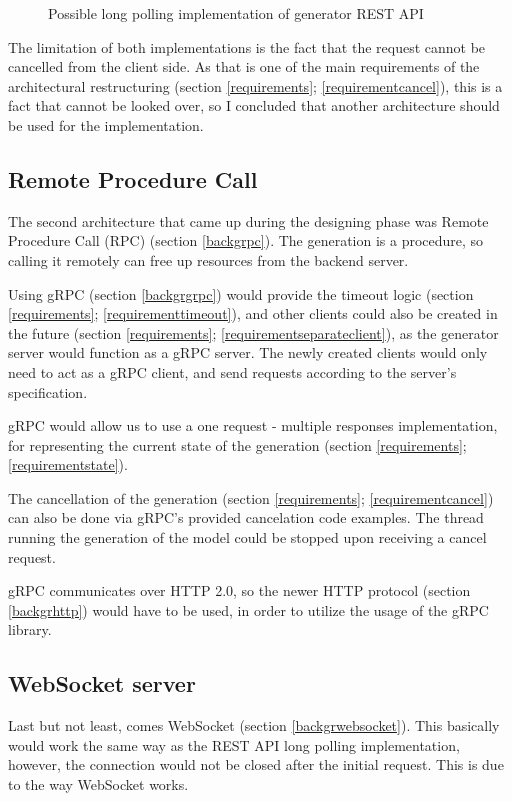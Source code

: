 \begin{itemize}
\begin{figure}
\begin{center}
				\caption{Possible long polling implementation of generator REST API}
				\label{longpollingimage}
			\end{center}
		\end{figure}
\end{itemize}
The limitation of both implementations is the fact that the request cannot be cancelled from the client side. As that is one 
of the main requirements of the architectural restructuring (section \ref{requirements}; \ref{requirementcancel}), this 
is a fact that cannot be looked over, so I concluded that 
another architecture should be used for the implementation.


\subsection{Remote Procedure Call} \label{rpcconsiderations}
	The second architecture that came up during the designing phase was Remote Procedure Call (RPC) (section \ref{backgrpc}). 
	The generation is a procedure, so calling it remotely can free up resources from the backend server. 

	Using gRPC (section \ref{backgrgrpc}) would provide the timeout logic (section \ref{requirements}; \ref{requirementtimeout}), 
	and other clients
	could also be created in the future (section \ref{requirements}; \ref{requirementseparateclient}), 
	as the generator server would function as a gRPC server. The newly created clients would only need to
	act as a gRPC client, and send requests according to the server's specification.

	gRPC would allow us to use a one request - multiple responses implementation, for 
	representing the current state of the generation (section \ref{requirements}; \ref{requirementstate}). 

	The cancellation of the generation (section \ref{requirements}; \ref{requirementcancel}) 
	can also be done via gRPC's provided cancelation code examples. The thread running the generation of
	the model could be stopped upon receiving a cancel request.

	gRPC communicates over HTTP 2.0, so the newer HTTP protocol (section \ref{backgrhttp}) 
	would have to be used, in order to utilize the usage of the gRPC library.

\subsection{WebSocket server} \label{considerationwebsocket}
	Last but not least, comes WebSocket (section \ref{backgrwebsocket}). 
	This basically would work the same way as the REST API long polling implementation,
	however, the connection would not be closed after the initial request. This is due to the way WebSocket works.
	

